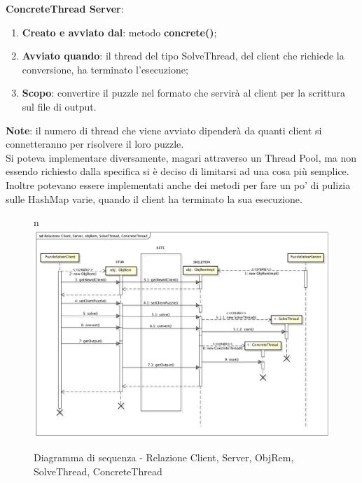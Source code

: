 \textbf{ConcreteThread Server}:
	\begin{enumerate}
		\item \textbf{Creato e avviato dal}: metodo \textbf{concrete()};
		\item \textbf{Avviato quando}: il thread del tipo SolveThread, del client che richiede la conversione, ha terminato l'esecuzione;
		\item \textbf{Scopo}: convertire il puzzle nel formato che servirà al client per la scrittura sul file di output.
	\end{enumerate}
	\noindent
\textbf{Note}: il numero di thread che viene avviato dipenderà da quanti client si connetteranno per risolvere il loro puzzle. \\
Si poteva implementare diversamente, magari attraverso un Thread Pool, ma non essendo richiesto dalla specifica si è deciso di limitarsi ad una cosa più semplice. \\
Inoltre potevano essere implementati anche dei metodi per fare un po' di pulizia sulle HashMap varie, quando il client ha terminato la sua esecuzione.

	\begin{figure}[htbp]
		\centering
		\centerline{n\includegraphics[scale=0.5]{img/seq_client_server.pdf}}
		\caption{Diagramma di sequenza - Relazione Client, Server, ObjRem, SolveThread, ConcreteThread}
		\label{fig:dia_seq_rel_client_server}
	\end{figure}	




